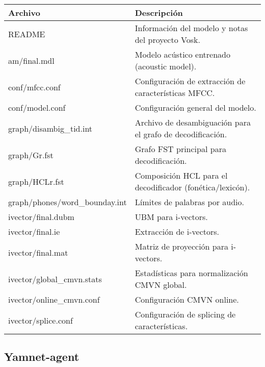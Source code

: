 \begin{table}[H]
  \doublespacing
  \begin{tabularx}{\textwidth}{l X}
    \hline
    \textbf{Archivo}               & \textbf{Descripción}                                       \\
    \hline
    README                         & Información del modelo y notas del proyecto Vosk.          \\
    am/final.mdl                   & Modelo acústico entrenado (acoustic model).                \\
    conf/mfcc.conf                 & Configuración de extracción de características MFCC.       \\
    conf/model.conf                & Configuración general del modelo.                          \\
    graph/disambig\_tid.int        & Archivo de desambiguación para el grafo de decodificación. \\
    graph/Gr.fst                   & Grafo FST principal para decodificación.                   \\
    graph/HCLr.fst                 & Composición HCL para el decodificador (fonética/lexicón).  \\
    graph/phones/word\_bounday.int & Límites de palabras por audio.                             \\
    ivector/final.dubm             & UBM para i-vectors.                                        \\
    ivector/final.ie               & Extracción de i-vectors.                                   \\
    ivector/final.mat              & Matriz de proyección para i-vectors.                       \\
    ivector/global\_cmvn.stats     & Estadísticas para normalización CMVN global.               \\
    ivector/online\_cmvn.conf      & Configuración CMVN online.                                 \\
    ivector/splice.conf            & Configuración de splicing de características.              \\
    \hline
  \end{tabularx}
\end{table}

\subsection*{Yamnet-agent}


